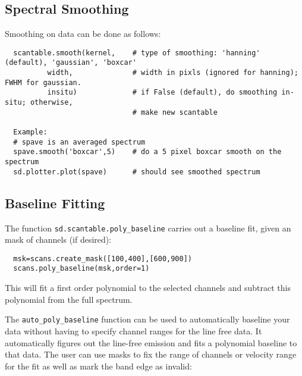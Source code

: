 \subsection{Spectral Smoothing}
\label{subsection:sd.asap.smoothing}

Smoothing on data can be done as follows:

\small
\begin{verbatim}
  scantable.smooth(kernel,    # type of smoothing: 'hanning' (default), 'gaussian', 'boxcar'
          width,              # width in pixls (ignored for hanning); FWHM for gaussian.
          insitu)             # if False (default), do smoothing in-situ; otherwise, 
                              # make new scantable

  Example:
  # spave is an averaged spectrum
  spave.smooth('boxcar',5)    # do a 5 pixel boxcar smooth on the spectrum
  sd.plotter.plot(spave)      # should see smoothed spectrum
\end{verbatim}
\normalsize

\subsection{Baseline Fitting}
\label{subsection:sd.asap.BLfitting}

The function {\tt sd.scantable.poly\_baseline} carries out a
baseline fit, given an mask of channels (if desired):
\small
\begin{verbatim}
  msk=scans.create_mask([100,400],[600,900])
  scans.poly_baseline(msk,order=1)
\end{verbatim}
\normalsize
This will fit a first order polynomial to the selected channels and
subtract this polynomial from the full spectrum.

The {\tt auto\_poly\_baseline} function can be used to automatically
baseline your data without having to specify channel ranges for the
line free data. It automatically figures out the line-free emission
and fits a polynomial baseline to that data. The user can use masks to
fix the range of channels or velocity range for the fit as well as
mark the band edge as invalid:



